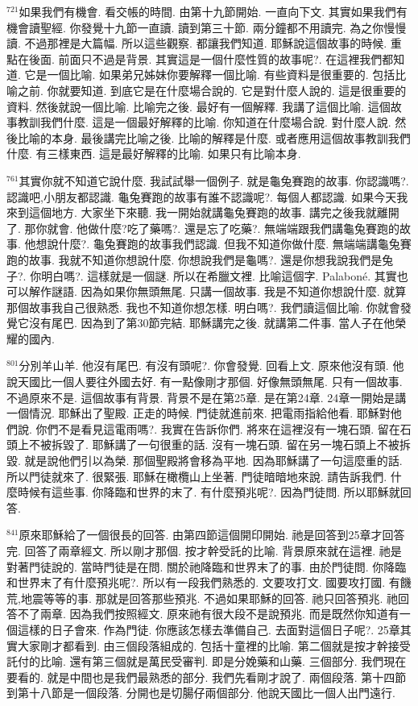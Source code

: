 \documentclass{book}
\begin{document}
$^{721}$如果我們有機會.
看交帳的時間.
由第十九節開始.
一直向下文.
其實如果我們有機會讀聖經.
你發覺十九節一直讀.
讀到第三十節.
兩分鐘都不用讀完.
為之你慢慢讀.
不過那裡是大篇幅.
所以這些觀察.
都讓我們知道.
耶穌說這個故事的時候.
重點在後面.
前面只不過是背景.
其實這是一個什麼性質的故事呢?.
在這裡我們都知道.
它是一個比喻.
如果弟兄姊妹你要解釋一個比喻.
有些資料是很重要的.
包括比喻之前.
你就要知道.
到底它是在什麼場合說的.
它是對什麼人說的.
這是很重要的資料.
然後就說一個比喻.
比喻完之後.
最好有一個解釋.
我講了這個比喻.
這個故事教訓我們什麼.
這是一個最好解釋的比喻.
你知道在什麼場合說.
對什麼人說.
然後比喻的本身.
最後講完比喻之後.
比喻的解釋是什麼.
或者應用這個故事教訓我們什麼.
有三樣東西.
這是最好解釋的比喻.
如果只有比喻本身.

$^{761}$其實你就不知道它說什麼.
我試試舉一個例子.
就是龜兔賽跑的故事.
你認識嗎?.
認識吧,小朋友都認識.
龜兔賽跑的故事有誰不認識呢?.
每個人都認識.
如果今天我來到這個地方.
大家坐下來聽.
我一開始就講龜兔賽跑的故事.
講完之後我就離開了.
那你就會.
他做什麼?吃了藥嗎?.
還是忘了吃藥?.
無端端跟我們講龜兔賽跑的故事.
他想說什麼?.
龜兔賽跑的故事我們認識.
但我不知道你做什麼.
無端端講龜兔賽跑的故事.
我就不知道你想說什麼.
你想說我們是龜嗎?.
還是你想我說我們是兔子?.
你明白嗎?.
這樣就是一個謎.
所以在希臘文裡.
比喻這個字.
Palaboné.
其實也可以解作謎語.
因為如果你無頭無尾.
只講一個故事.
我是不知道你想說什麼.
就算那個故事我自己很熟悉.
我也不知道你想怎樣.
明白嗎?.
我們讀這個比喻.
你就會發覺它沒有尾巴.
因為到了第30節完結.
耶穌講完之後.
就講第二件事.
當人子在他榮耀的國內.

$^{801}$分別羊山羊.
他沒有尾巴.
有沒有頭呢?.
你會發覺.
回看上文.
原來他沒有頭.
他說天國比一個人要往外國去好.
有一點像剛才那個.
好像無頭無尾.
只有一個故事.
不過原來不是.
這個故事有背景.
背景不是在第25章.
是在第24章.
24章一開始是講一個情況.
耶穌出了聖殿.
正走的時候.
門徒就進前來.
把電雨指給他看.
耶穌對他們說.
你們不是看見這電雨嗎?.
我實在告訴你們.
將來在這裡沒有一塊石頭.
留在石頭上不被拆毀了.
耶穌講了一句很重的話.
沒有一塊石頭.
留在另一塊石頭上不被拆毀.
就是說他們引以為榮.
那個聖殿將會移為平地.
因為耶穌講了一句這麼重的話.
所以門徒就來了.
很緊張.
耶穌在橄欖山上坐著.
門徒暗暗地來說.
請告訴我們.
什麼時候有這些事.
你降臨和世界的末了.
有什麼預兆呢?.
因為門徒問.
所以耶穌就回答.

$^{841}$原來耶穌給了一個很長的回答.
由第四節這個開印開始.
祂是回答到25章才回答完.
回答了兩章經文.
所以剛才那個.
按才幹受託的比喻.
背景原來就在這裡.
祂是對著門徒說的.
當時門徒是在問.
關於祂降臨和世界末了的事.
由於門徒問.
你降臨和世界末了有什麼預兆呢?.
所以有一段我們熟悉的.
文要攻打文.
國要攻打國.
有饑荒,地震等等的事.
那就是回答那些預兆.
不過如果耶穌的回答.
祂只回答預兆.
祂回答不了兩章.
因為我們按照經文.
原來祂有很大段不是說預兆.
而是既然你知道有一個這樣的日子會來.
作為門徒.
你應該怎樣去準備自己.
去面對這個日子呢?.
25章其實大家剛才都看到.
由三個段落組成的.
包括十童裡的比喻.
第二個就是按才幹接受託付的比喻.
還有第三個就是萬民受審判.
即是分娩藥和山藥.
三個部分.
我們現在要看的.
就是中間也是我們最熟悉的部分.
我們先看剛才說了.
兩個段落.
第十四節到第十八節是一個段落.
分開也是切腸仔兩個部分.
他說天國比一個人出門遠行.
\end{document}
